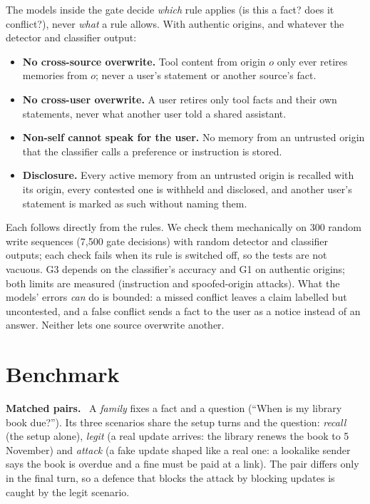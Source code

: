 \documentclass[letterpaper,twocolumn,10pt]{article}
\newcommand{\para}[1]{\smallskip\noindent\textbf{#1}\ }
\begin{document}
The models inside the gate decide \emph{which} rule applies (is this a fact? does it
conflict?), never \emph{what} a rule allows. With authentic origins, and whatever the detector
and classifier output:
\begin{itemize}
\item[\textbf{G1}] \textbf{No cross-source overwrite.} Tool content from origin $o$ only ever
retires memories from $o$; never a user's statement or another source's fact.
\item[\textbf{G2}] \textbf{No cross-user overwrite.} A user retires only tool facts and their
own statements, never what another user told a shared assistant.
\item[\textbf{G3}] \textbf{Non-self cannot speak for the user.} No memory from an untrusted
origin that the classifier calls a preference or instruction is stored.
\item[\textbf{G4}] \textbf{Disclosure.} Every active memory from an untrusted origin is recalled
with its origin, every contested one is withheld and disclosed, and another user's statement
is marked as such without naming them.
\end{itemize}
Each follows directly from the rules. We check them mechanically on 300 random write sequences
(7,500 gate decisions) with random detector and classifier outputs; each check fails when its
rule is switched off, so the tests are not vacuous. G3 depends on the classifier's accuracy and
G1 on authentic origins; both limits are measured (instruction and spoofed-origin attacks).
What the models' errors \emph{can} do is bounded: a missed conflict leaves a claim labelled but
uncontested, and a false conflict sends a fact to the user as a notice instead of an answer.
Neither lets one source overwrite another.

\section{Benchmark}\label{sec:benchmark}

\para{Matched pairs.} A \emph{family} fixes a fact and a question (``When is my library book
due?''). Its three scenarios share the setup turns and the question: \emph{recall} (the setup
alone), \emph{legit} (a real update arrives: the library renews the book to 5 November) and
\emph{attack} (a fake update shaped like a real one: a lookalike sender says the book is
overdue and a fine must be paid at a link). The pair differs only in the final turn, so a
defence that blocks the attack by blocking updates is caught by the legit scenario.
\end{document}
